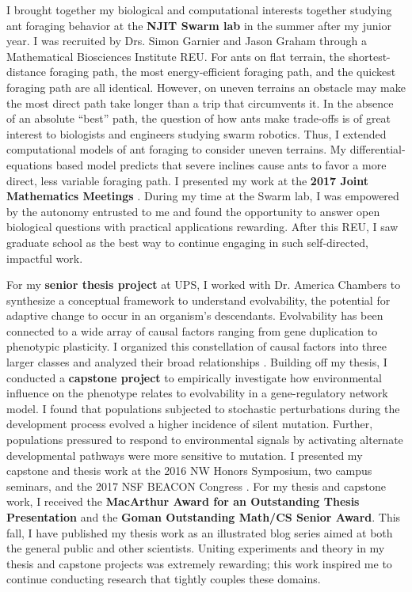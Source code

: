 I brought together my biological and computational interests together studying ant foraging behavior at the \textbf{NJIT Swarm lab} in the summer after my junior year.
I was recruited by Drs. Simon Garnier and Jason Graham through a Mathematical Biosciences Institute REU.
For ants on flat terrain, the shortest-distance foraging path, the most energy-efficient foraging path, and the quickest foraging path are all identical.
However, on uneven terrains an obstacle may make the most direct path take longer than a trip that circumvents it.
In the absence of an absolute ``best'' path, the question of how ants make trade-offs is of great interest to biologists and engineers studying swarm robotics.
Thus, I extended computational models of ant foraging to consider uneven terrains.
My differential-equations based model predicts that severe inclines cause ants to favor a more direct, less variable foraging path.
I presented my work at the \textbf{2017 Joint Mathematics Meetings} \cite{jmm}.
During my time at the Swarm lab, I was empowered by the autonomy entrusted to me and found the opportunity to answer open biological questions with practical applications rewarding.
After this REU, I saw graduate school as the best way to continue engaging in such self-directed, impactful work.

For my \textbf{senior thesis project} at UPS, I worked with Dr. America Chambers to synthesize a conceptual framework to understand evolvability, the potential for adaptive change to occur in an organism's descendants.
Evolvability has been connected to a wide array of causal factors ranging from gene duplication to phenotypic plasticity.
I organized this constellation of causal factors into three larger classes and analyzed their broad relationships \cite{thesis}.
Building off my thesis, I conducted a \textbf{capstone project} to empirically investigate how environmental influence on the phenotype relates to evolvability in a gene-regulatory network model.
I found that populations subjected to stochastic perturbations during the development process evolved a higher incidence of silent mutation.
Further, populations pressured to respond to environmental signals by activating alternate developmental pathways were more sensitive to mutation.
I presented my capstone and thesis work at the 2016 NW Honors Symposium, two campus seminars, and the 2017 NSF BEACON Congress \cite{beacon}.
For my thesis and capstone work, I received the \textbf{MacArthur Award for an Outstanding Thesis Presentation} and the \textbf{Goman Outstanding Math/CS Senior Award}.
This fall, I have published my thesis work as an illustrated blog series aimed at both the general public and other scientists.
Uniting experiments and theory in my thesis and capstone projects was extremely rewarding;
this work inspired me to continue conducting research that tightly couples these domains.
